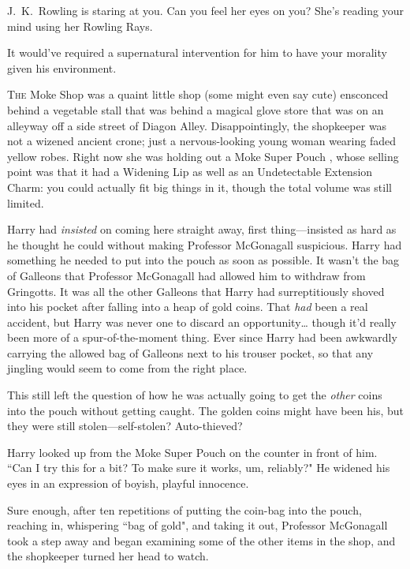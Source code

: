 
\begin{chapterOpeningAuthorNote}
J.~K.~Rowling is staring at you. Can you feel her eyes on you? She's reading your mind using her Rowling Rays.
\end{chapterOpeningAuthorNote}
\begin{chapterOpeningQuote}
It would've required a supernatural intervention for him to have your morality given his environment.
\end{chapterOpeningQuote}

\lettrine{T}{he} Moke Shop was a quaint little shop (some might even say cute) ensconced behind a vegetable stall that was behind a magical glove store that was on an alleyway off a side street of Diagon Alley. Disappointingly, the shopkeeper was not a wizened ancient crone; just a nervous-looking young woman wearing faded yellow robes. Right now she was holding out a Moke Super Pouch , whose selling point was that it had a Widening Lip as well as an Undetectable Extension Charm: you could actually fit big things in it, though the total volume was still limited.

Harry had \emph{insisted} on coming here straight away, first thing—insisted as hard as he thought he could without making Professor McGonagall suspicious. Harry had something he needed to put into the pouch as soon as possible. It wasn't the bag of Galleons that Professor McGonagall had allowed him to withdraw from Gringotts. It was all the other Galleons that Harry had surreptitiously shoved into his pocket after falling into a heap of gold coins. That \emph{had} been a real accident, but Harry was never one to discard an opportunity{\ldots} though it'd really been more of a spur-of-the-moment thing. Ever since Harry had been awkwardly carrying the allowed bag of Galleons next to his trouser pocket, so that any jingling would seem to come from the right place.

This still left the question of how he was actually going to get the \emph{other} coins into the pouch without getting caught. The golden coins might have been his, but they were still stolen—self-stolen? Auto-thieved?

Harry looked up from the Moke Super Pouch  on the counter in front of him. ``Can I try this for a bit? To make sure it works, um, reliably?" He widened his eyes in an expression of boyish, playful innocence.

Sure enough, after ten repetitions of putting the coin-bag into the pouch, reaching in, whispering ``bag of gold", and taking it out, Professor McGonagall took a step away and began examining some of the other items in the shop, and the shopkeeper turned her head to watch.

